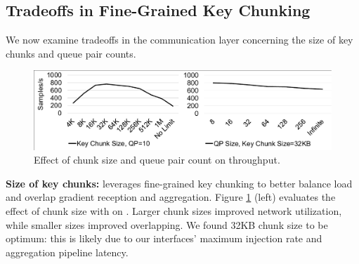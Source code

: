 


\subsection{Tradeoffs in Fine-Grained Key Chunking}
\label{sec:commParam}
We now examine tradeoffs in the communication layer concerning the size of key chunks and queue pair counts.

\begin{figure}[t!]
    \centering
	\includegraphics[width=.7\columnwidth,trim=4 8 2 4,clip,]{Figures/QPandKeyChunkSize.pdf}
	\caption{Effect of chunk size and queue pair count on throughput.}
	\label{fig:QPandKeyChunk}
\end{figure}

\vspace{0.05in}
\noindent \textbf{Size of key chunks:}
\label{sec:keyChunking}
\phub leverages fine-grained key chunking to better balance load and overlap gradient reception and aggregation. Figure \ref{fig:QPandKeyChunk} (left) evaluates the effect of chunk size with  on \pbox. Larger chunk sizes improved network utilization, while smaller sizes improved overlapping. We found 32KB chunk size to be optimum: this is likely due to our interfaces' maximum injection rate and aggregation pipeline latency.


